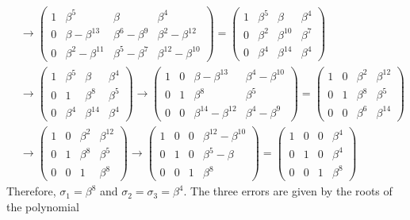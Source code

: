 \documentclass[11pt]{article}
\newcommand{\taugm}[1]{{\left(\begin{array}{lll|l}#1\end{array}\right)}}
\begin{document}
\begin{itemize}
\begin{align*}
                   &\to
                    \taugm{1 & \beta^5            & \beta           & \beta^4\\
                           0 & \beta  -\beta^{13} & \beta^6-\beta^9 & \beta^2   -\beta^{12} \\
                           0 & \beta^2-\beta^{11} & \beta^5-\beta^7 & \beta^{12}-\beta^{10}}
                    =
                    \taugm{1 & \beta^5 & \beta      & \beta^4\\
                           0 & \beta^2 & \beta^{10} & \beta^7\\
                           0 & \beta^4 & \beta^{14} & \beta^4}\\
                   &\to
                    \taugm{1 & \beta^5 & \beta      & \beta^4\\
                           0 & 1       & \beta^8    & \beta^5\\
                           0 & \beta^4 & \beta^{14} & \beta^4}
                    \to
                    \taugm{1 & 0 & \beta -\beta^{13}     & \beta^4-\beta^{10}\\
                           0 & 1 & \beta^8               & \beta^5\\
                           0 & 0 & \beta^{14}-\beta^{12} & \beta^4-\beta^9}
                    =
                    \taugm{1 & 0 & \beta^2 & \beta^{12}\\
                           0 & 1 & \beta^8 & \beta^5\\
                           0 & 0 & \beta^6 & \beta^{14}}\\
                   &\to
                    \taugm{1 & 0 & \beta^2 & \beta^{12}\\
                           0 & 1 & \beta^8 & \beta^5\\
                           0 & 0 & 1       & \beta^8}
                    \to
                    \taugm{1 & 0 & 0 & \beta^{12} - \beta^{10}\\
                           0 & 1 & 0 & \beta^5-\beta\\
                           0 & 0 & 1 & \beta^8}
                    =
                    \taugm{1 & 0 & 0 & \beta^4\\
                           0 & 1 & 0 & \beta^4\\
                           0 & 0 & 1 & \beta^8}
                  \end{align*}
                  Therefore, $\sigma_1 = \beta^8$ and $\sigma_2 = \sigma_3 = \beta^4$.
                  The three errors are given by the roots of the polynomial

\end{itemize}
\end{document}
